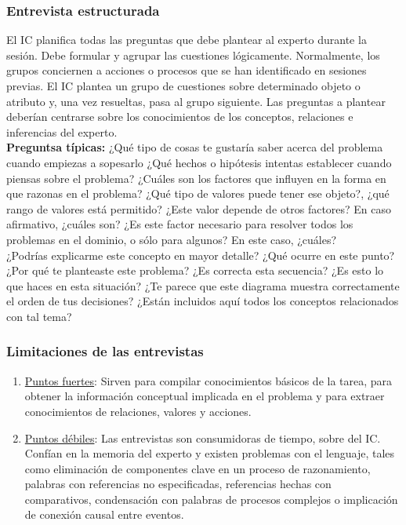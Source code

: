 \documentclass[12pt]{article}
\begin{document}
\subsubsection{Entrevista estructurada}
El IC planifica todas las preguntas que debe plantear al experto durante la sesión. Debe formular y agrupar las cuestiones lógicamente. Normalmente, los grupos conciernen a acciones o procesos que se han identificado en sesiones previas. El IC plantea un grupo de cuestiones sobre determinado objeto o atributo y, una vez resueltas, pasa al grupo siguiente. Las preguntas a plantear deberían centrarse sobre los conocimientos de los conceptos, relaciones e inferencias del experto.\\
\textbf{Preguntsa típicas:}
¿Qué tipo de cosas te gustaría saber acerca del problema cuando empiezas a sopesarlo ¿Qué hechos o hipótesis intentas establecer cuando piensas sobre el problema? ¿Cuáles son los factores que influyen en la forma en que razonas en el problema? ¿Qué tipo de valores puede tener ese objeto?, ¿qué rango de valores está permitido? ¿Este valor depende de otros factores? En caso afirmativo, ¿cuáles son? ¿Es este factor necesario para resolver todos los problemas en el dominio, o sólo para algunos? En este caso, ¿cuáles?\\

¿Podrías explicarme este concepto en mayor detalle? ¿Qué ocurre en este punto? ¿Por qué te planteaste este problema? ¿Es correcta esta secuencia? ¿Es esto lo que haces en esta situación? ¿Te parece que este diagrama muestra correctamente el orden de tus decisiones? ¿Están incluidos aquí todos los conceptos relacionados con tal tema?

\subsubsection{Limitaciones de las entrevistas}
\begin{enumerate}
\item \underline{Puntos fuertes}: Sirven para compilar conocimientos básicos de la tarea, para obtener la información conceptual implicada en el problema y para extraer conocimientos de relaciones, valores y acciones.
\item \underline{Puntos débiles}: Las entrevistas son consumidoras de tiempo, sobre del IC. Confían en la memoria del experto y existen problemas con el lenguaje, tales como eliminación de componentes clave en un proceso de razonamiento, palabras con referencias no especificadas, referencias hechas con comparativos, condensación con palabras de procesos complejos o implicación de conexión causal entre eventos.
\end{enumerate}
\end{document}
